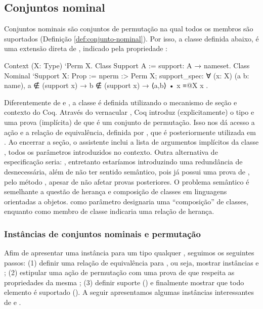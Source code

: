 \subsection{Conjuntos nominal}
Conjuntos nominais são conjuntos de permutação na qual todos os membros são suportados (Definição \ref{def:conjunto-nominal}). Por isso, a classe  definida abaixo, é uma extensão direta de , indicado pela propriedade :
\begin{coqcode}
Context (X: Type) `{Perm X}.
Class Support A := support: A → nameset.
Class Nominal `{Support X}: Prop := {
   nperm :> Perm X;
   support_spec: ∀ (x: X) (a b: name),
      a ∉ (support x) → b ∉ (support x) → ⟨a,b⟩ • x ≡@{X} x
}.
\end{coqcode}
Diferentemente de  e , a classe  é definida utilizando o mecanismo de seção e contexto do Coq. Através do vernacular , Coq introduz (explicitamente) o tipo  e uma prova (implícita) de que é um conjunto de permutação. Isso nos dá acesso a ação e a relação de equivalência, definida por , que é posteriormente utilizada em . Ao encerrar a seção, o assistente inclui a lista de argumentos implícitos da classe , todos os parâmetros introduzidos no contexto. Outra alternativa de especificação seria: , entretanto estaríamos introduzindo uma redundância de  desnecessária, além de não ter sentido semântico, pois  já possui uma prova de , pelo método , apesar de não afetar provas posteriores. O problema semântico é semelhante a questão de herança e composição de classes em linguagens orientadas a objetos.  como parâmetro designaria uma ``composição'' de classes, enquanto como membro de classe indicaria uma relação de herança.


\subsubsection{Instâncias de conjuntos nominais e permutação}
Afim de apresentar uma instância  para um tipo qualquer , seguimos os seguintes passos: (1) definir uma relação de equivalência para , ou seja, mostrar instâncias  e ; (2) estipular uma ação de permutação  com uma prova de que respeita as propriedades da mesma ; (3) definir suporte () e finalmente mostrar que todo elemento é suportado (). A seguir apresentamos algumas instâncias interessantes de  e .

